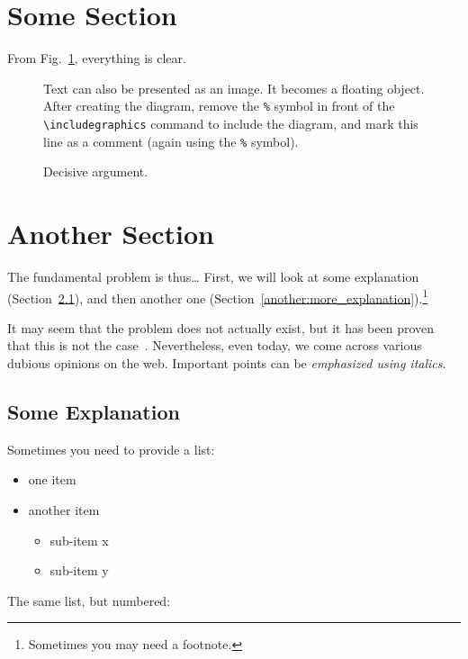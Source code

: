 \documentclass[10pt,twocolumn,twoside,a4paper]{report} %
\begin{document}
\section{Some Section} \label{some_section}

From Fig.~\ref{f:decision}, everything is clear. 

\begin{figure}[tbh]
\centering
Text can also be presented as an image. It becomes a floating object. After creating the diagram, remove the \texttt{\%} symbol in front of the \verb|\includegraphics| command to include the diagram, and mark this line as a comment (again using the \texttt{\%} symbol).
\caption{Decisive argument.}
\label{f:decision}
\end{figure}

\section{Another Section} \label{another_section}

The fundamental problem is thus\ldots{} First, we will look at some explanation (Section~\ref{another:some_explanation}), and then another one (Section~\ref{another:more_explanation}).\footnote{Sometimes you may need a footnote.}

It may seem that the problem does not actually exist\cite{Coplien:MPD}, but it has been proven that this is not the case~\cite{Czarnecki:Staged, Czarnecki:Progress}. Nevertheless, even today, we come across various dubious opinions on the web\cite{PLP-Framework}. Important points can be \emph{emphasized using italics}.

\subsection{Some Explanation} \label{another:some_explanation}

Sometimes you need to provide a list:

\begin{itemize}
\item one item
\item another item
	\begin{itemize}
	\item sub-item x
	\item sub-item y
	\end{itemize}
\end{itemize}

The same list, but numbered:
\end{document}
